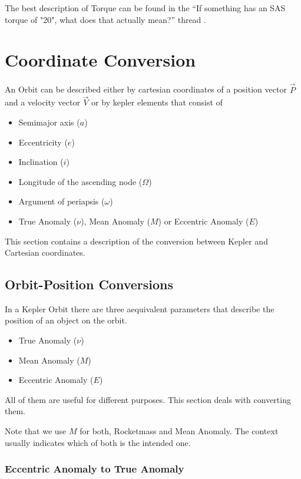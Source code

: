 \documentclass[11pt]{article}
\newcommand{\oa}[1]{\overrightarrow{#1}}
\newcommand{\Pos}{\oa{P}}
\newcommand{\Vel}{\oa{V}}
\begin{document}
The best description of Torque can be found in the ``If something has
an SAS torque of "20", what does that actually mean?'' thread
\cite{torque}.

\section{Coordinate Conversion}

An Orbit can be described either by cartesian coordinates of a
position vector $\Pos$ and a velocity vector $\Vel$ or by kepler
elements \cite{Kepler} that consist of

\begin{itemize}
\item Semimajor axis ($a$)
\item Eccentricity ($e$)
\item Inclination ($i$)
\item Longitude of the ascending node ($\Omega$)
\item Argument of periapsis ($\omega$)
\item True Anomaly ($\nu$), Mean Anomaly ($M$) or Eccentric Anomaly ($E$)
\end{itemize}

This section contains a description of the conversion between Kepler
and Cartesian coordinates.

\subsection{Orbit-Position Conversions}

In a Kepler Orbit there are three aequivalent parameters that describe
the position of an object on the orbit.

\begin{itemize}
\item True Anomaly ($\nu$) \cite{TrueA}
\item Mean Anomaly ($M$) \cite{MeanA}
\item Eccentric Anomaly ($E$) \cite{EccentricA}
\end{itemize}

All of them are useful for different purposes. This section deals with
converting them.

Note that we use $M$ for both, Rocketmass and Mean Anomaly. The
context usually indicates which of both is the intended one.

\subsubsection{Eccentric Anomaly to True Anomaly}
\end{document}
